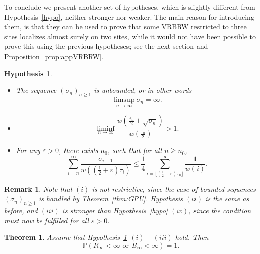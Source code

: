\documentclass[11pt]{article}
\newtheorem {theo} {Theorem} [section]
\newtheorem {rem} {Remark} [section]
\newtheorem {Hypo} {Hypothesis} [section]
\newcommand{\1}{{\text{\Large $\mathfrak 1$}}}
\begin{document}
To conclude we present another set of hypotheses, which is slightly different from Hypothesis~\ref{hypo}, neither stronger nor weaker. The main reason for introducing them, is that they can be used to prove that some VRBRW restricted to three sites localizes almost surely on two sites, while it would not have been possible to prove this using the previous hypotheses; see the next section and Proposition~\ref{prop:appVRBRW}.  

\begin{Hypo}\label{hypo2}
\begin{itemize}
\item[$(i)$] The sequence $(\sigma_n)_{n\ge 1}$ is unbounded, or in other words  
$$\limsup_{n\to \infty} \sigma_n = \infty. $$  
\item[$(ii)$] $$\liminf_{n\to \infty} \frac{w( \frac{\tau_n}{2} + \sqrt{\sigma_n})}{w(\frac{\tau_n}{2})} >1. $$ 
\item[$(iii)$]  For any $\varepsilon>0$, there exists $n_0$, such that for all $n\ge n_0$,  
$$\sum_{i=n}^\infty \frac{\sigma_{i+1}}{w((\frac 12 +\varepsilon)\tau_i)} \le \frac 14 \sum_{i = \lfloor (\frac 12 - \varepsilon) \tau_n\rfloor }^\infty \frac 1{w(i)}. $$ 
\end{itemize}
\end{Hypo}
\begin{rem}\emph{
Note that $(i)$ is not restrictive, since the case of bounded sequences $(\sigma_n)_{n\ge 1}$ is handled by Theorem~\ref{thm:GPU}. Hypothesis $(ii)$ is the same as before, and $(iii)$ is stronger than Hypothesis~\ref{hypo} $(iv)$, since the condition must now be fulfilled for all $\varepsilon>0$. }
\end{rem}
\begin{theo}\label{thm.loc.bis}
Assume that Hypothesis~\ref{hypo2} $(i)-(iii)$ hold. Then 
$$\mathbb P(R_\infty<\infty \text{ or } B_\infty<\infty)= 1. $$ 
\end{theo}
\end{document}
